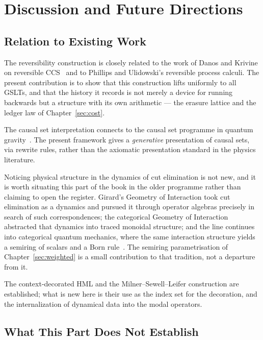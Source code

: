 \chapter{Discussion and Future Directions}
\label{sec:discussion}

\section{Relation to Existing Work}

The reversibility construction is closely related to the work of Danos and
Krivine on reversible CCS~\cite{danos2004reversible} and to Phillips and
Ulidowski's reversible process calculi.  The present contribution is to
show that this construction lifts uniformly to all GSLTs, and that the
history it records is not merely a device for running backwards but a
structure with its own arithmetic --- the erasure lattice and the ledger
law of Chapter~\ref{sec:cost}.

The causal set interpretation connects to the causal set programme in
quantum gravity~\cite{bombelli1987space}.  The present framework gives a
\emph{generative} presentation of causal sets, via rewrite rules, rather
than the axiomatic presentation standard in the physics literature.

Noticing physical structure in the dynamics of cut elimination is not new,
and it is worth situating this part of the book in the older programme
rather than claiming to open the register.  Girard's Geometry of
Interaction took cut elimination as a dynamics and pursued it through
operator algebras precisely in search of such correspondences; the
categorical Geometry of Interaction abstracted that dynamics into traced
monoidal structure; and the line continues into categorical quantum
mechanics, where the same interaction structure yields a semiring of
scalars and a Born rule~\cite{abramsky}.  The semiring parametrisation of
Chapter~\ref{sec:weighted} is a small contribution to that tradition, not
a departure from it.

The context-decorated HML and the Milner--Sewell--Leifer construction are
established; what is new here is their use as the index set for the
decoration, and the internalization of dynamical data into the modal
operators.

\section{What This Part Does Not Establish}

